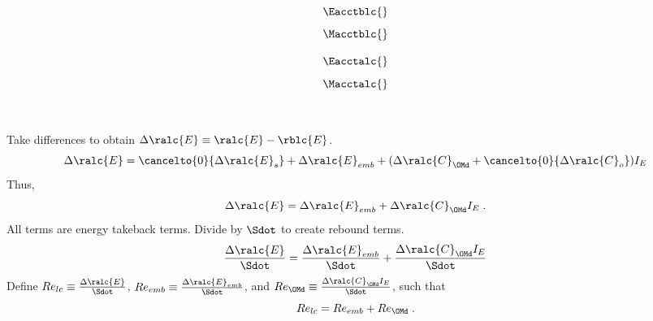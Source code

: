 

\begin{landscape}

\linespread{1}


\sectionsep{}

{
  \begin{equation}
  \Eacctblc{}
  \end{equation}
}
{
  \begin{equation}
  \Macctblc{}
  \end{equation}
}

\sectionsep{}

{
  \begin{equation}
  \Eacctalc{}
  \end{equation}
}
{
  \begin{equation}
  \Macctalc{}
  \end{equation}
}

\sectionsep{}

\derivsection{}
{
    ~
    
Take differences to obtain $\Delta \ralc{E} \equiv \ralc{E} - \rblc{E}$.
  \begin{equation}
  \Delta \ralc{E} = \cancelto{0}{\Delta \ralc{E}_s}
  + \Delta \ralc{E}_{emb}
  + (\Delta \ralc{C}_{\OMd} + \cancelto{0}{\Delta \ralc{C}_o}) I_E
  \end{equation}
  Thus, 
  \begin{equation}
  \Delta \ralc{E} = \Delta \ralc{E}_{emb} + \Delta \ralc{C}_{\OMd} I_E \; .
  \end{equation}
All terms are energy takeback terms.
Divide by $\Sdot$
to create rebound terms.
  \begin{equation}
  \frac{\Delta \ralc{E}}{\Sdot} = \frac{\Delta \ralc{E}_{emb}}{\Sdot} + \frac{\Delta \ralc{C}_{\OMd} I_E}{\Sdot}
  \end{equation}
  Define
  $Re_{lc} \equiv \frac{\Delta \ralc{E}}{\Sdot}$, 
  $Re_{emb} \equiv \frac{\Delta \ralc{E}_{emb}}{\Sdot}$, and
  $Re_{\OMd} \equiv \frac{\Delta \ralc{C}_{\OMd} I_E}{\Sdot}$,
  such that
  \begin{equation}
  Re_{lc} = Re_{emb} + Re_{\OMd} \; .
  \end{equation}
}
{
    ~
    
}
\end{landscape}
